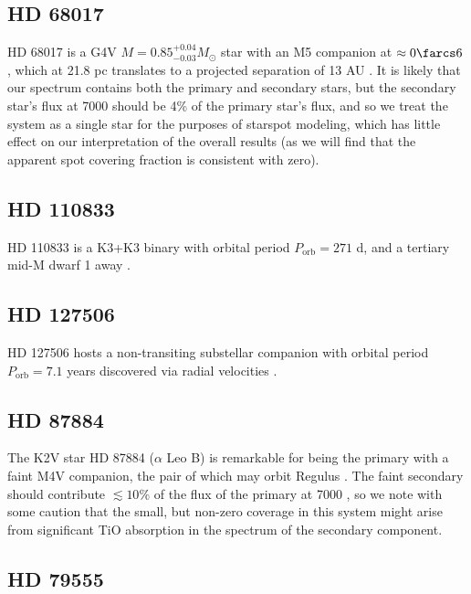 \begin{subappendices}
\subsection{HD 68017}
HD 68017 is a G4V $M=0.85^{+0.04}_{-0.03} M_\odot$ star with an M5 companion 
at $\approx0\farcs6$, which at 21.8 pc translates to a projected 
separation of 13 AU \citep{Crepp2012}. It is likely that our spectrum contains both the primary and secondary stars, but the secondary star's flux at 7000 \angstrom should be 4\% of the primary star's flux, and so we treat the system as a single star for the purposes of starspot modeling, which has little effect on our interpretation of the overall results  (as we will find that the apparent spot covering fraction is consistent with zero).

\subsection{HD 110833}

HD 110833 is a K3+K3 binary with orbital period $P_\mathrm{orb} = 271$ d, and a tertiary mid-M dwarf 1 away \citep{Rodriguez2015}.

\subsection{HD 127506}

HD 127506 hosts a non-transiting substellar companion with orbital period $P_\mathrm{orb}=7.1$ years discovered via radial velocities \citep{Reffert2011}. %

\subsection{HD 87884}

The K2V star HD 87884 ($\alpha$ Leo B) is remarkable for being the primary with a faint M4V companion, the pair of which may orbit Regulus \citep{Eggen1982,McAlister2005,Jankov2017}. The faint secondary should contribute $\lesssim 10\%$ of the flux of the primary at 7000 \angstrom, so we note with some caution that the small, but non-zero coverage in this system might arise from significant TiO absorption in the spectrum of the secondary component. 

\subsection{HD 79555}


\end{subappendices}
